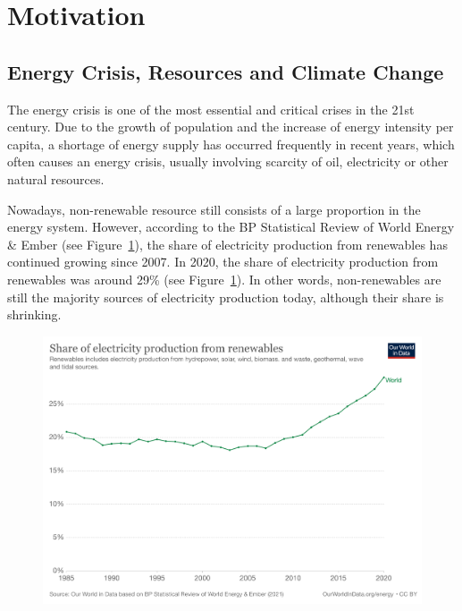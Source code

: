 
\section{Motivation}
\subsection{Energy Crisis, Resources and Climate Change}
The energy crisis is one of the most essential and critical crises in the 21st century. Due to the growth of population and the increase of energy intensity per capita, a shortage of energy supply has occurred frequently in recent years, which often causes an energy crisis, usually involving scarcity of oil, electricity or other natural resources. 

Nowadays, non-renewable resource still consists of a large proportion in the energy system. However, according to the BP Statistical Review of World Energy \& Ember (see Figure~\ref{intro_renewable}), the share of electricity production from renewables has continued growing since 2007. In 2020, the share of electricity production from renewables was around 29\% (see Figure~\ref{intro_renewable}). In other words, non-renewables are still the majority sources of electricity production today, although their share is shrinking.

\begin{figure}[!t]
\center
\includegraphics[scale=0.12]{img/intro_renewable.png}
\label{intro_renewable} %
\end{figure}

